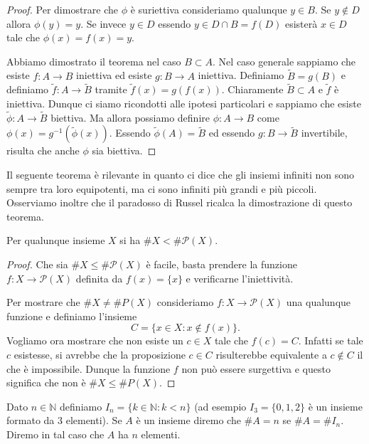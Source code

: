 \documentclass[italian,a4paper,hidelinks,headinclude]{scrartcl}
\newcommand{\NN}{{\mathbb N}}
\renewcommand{\P}{{\mathcal P}}
\begin{document}
\begin{proof}
Per dimostrare che $\phi$ è suriettiva consideriamo qualunque $y \in B$.
Se $y\not \in D$ allora $\phi(y)=y$.
Se invece $y\in D$ essendo $y\in D\cap B = f(D)$ esisterà $x\in D$ tale
che $\phi(x) = f(x) = y$.

Abbiamo dimostrato il teorema nel caso $B\subset A$.
Nel caso generale sappiamo che esiste $f\colon A\to B$ iniettiva
ed esiste $g\colon B\to A$ iniettiva. Definiamo $\tilde B=g(B)$ e
definiamo $\tilde f\colon A\to \tilde B$ tramite $\tilde f(x) = g(f(x))$.
Chiaramente $\tilde B\subset A$ e $\tilde f$ è iniettiva.
Dunque ci siamo ricondotti alle ipotesi particolari e sappiamo che esiste
$\tilde \phi \colon A \to \tilde B$ biettiva. Ma allora possiamo definire
$\phi\colon A\to B$ come $\phi(x) = g^{-1}(\tilde \phi(x))$.
Essendo $\tilde \phi(A)=\tilde B$ ed essendo $g\colon B\to \tilde B$
invertibile, risulta che anche $\phi$ sia biettiva.
\end{proof}


Il seguente teorema è rilevante in quanto ci dice che gli insiemi infiniti
non sono sempre tra loro equipotenti, ma ci sono infiniti più grandi e più piccoli.
Osserviamo inoltre che il paradosso di Russel
ricalca la dimostrazione di questo teorema.

\begin{theorem}[Cantor]
Per qualunque insieme $X$ si ha $\# X < \# \P(X)$.
\end{theorem}
%
\begin{proof}
Che sia $\#X\le \#\P(X)$ è facile, basta prendere la funzione
$f\colon X\to \P(X)$ definita da $f(x) = \{x\}$ e verificarne
l'iniettività.

Per mostrare che $\# X \neq \#P(X)$ consideriamo
$f\colon X \to \P(X)$ una qualunque funzione
e definiamo l'insieme
\[
   C = \{x \in X \colon x \not \in f(x) \}.
\]
Vogliamo ora mostrare che non esiste un $c\in X$ tale che $f(c) = C$.
Infatti se tale $c$ esistesse, si avrebbe che la proposizione
$c\in C$ risulterebbe equivalente a $c\not \in C$ il che è impossibile.
Dunque la funzione $f$ non può essere surgettiva e questo significa che
non è $\#X \le \#P(X)$.
\end{proof}

\begin{definition}
Dato $n\in \NN$ definiamo $I_n = \{k\in \NN\colon k < n\}$
(ad esempio $I_3=\{0,1,2\}$ è un insieme formato da $3$ elementi).
Se $A$ è un insieme diremo che $\# A= n$ se $\# A = \# I_n$.
Diremo in tal caso che $A$ ha $n$ elementi.
\end{definition}
\end{document}
